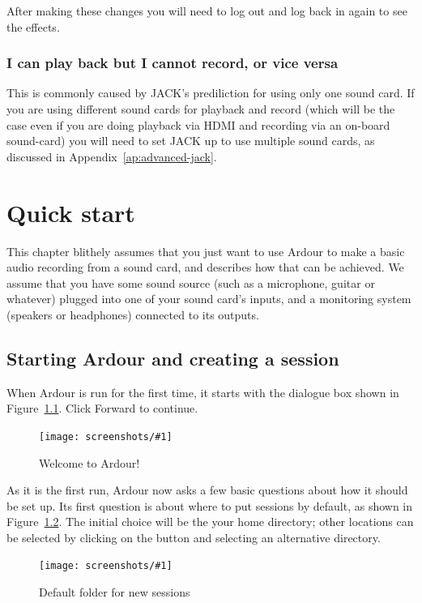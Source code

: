 \documentclass[10pt,a4paper]{book}
\newcommand{\button}[1]{#1}
\newcommand{\screenshot}[3]{%
\begin{figure}[ht]%
\begin{center}
\texttt{[image: screenshots/\#1]}
\end{center}
\caption{#2}
\label{#3}
\end{figure}}
\begin{document}
After making these changes you will need to log out and log back in
again to see the effects.


\subsection{I can play back but I cannot record, or vice versa}

This is commonly caused by JACK's prediliction for using only
one sound card.  If you are using different sound cards for playback
and record (which will be the case even if you are doing playback via
HDMI and recording via an on-board sound-card) you will need to set
JACK up to use multiple sound cards, as discussed in
Appendix~\ref{ap:advanced-jack}.


\chapter{Quick start}

This chapter blithely assumes that you just want to use Ardour to make
a basic audio recording from a sound card, and describes how that can
be achieved.  We assume that you have some sound source (such as a
microphone, guitar or whatever) plugged into one of your sound card's
inputs, and a monitoring system (speakers or headphones) connected to
its outputs.


\section{Starting Ardour and creating a session}

When Ardour is run for the first time, it starts with the dialogue box
shown in Figure~\ref{fig:welcome-to-ardour}.  Click \button{Forward} to continue.

\screenshot{welcome-to-ardour.png}{Welcome to Ardour!}{fig:welcome-to-ardour}

As it is the first run, Ardour now asks a few basic questions about
how it should be set up.  Its first question is about where to put
sessions by default, as shown in
Figure~\ref{fig:default-folder-for-new-sessions}.  The initial choice
will be the your home directory; other locations can be selected by
clicking on the button and selecting an alternative directory.

\screenshot{default-folder-for-new-sessions.png}{Default folder for new sessions}{fig:default-folder-for-new-sessions}
\end{document}
